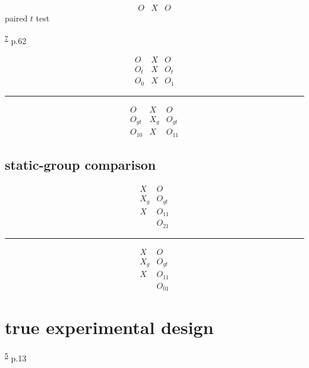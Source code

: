 \documentclass[
]{book}
\theoremstyle{definition}
\theoremstyle{definition}
\theoremstyle{definition}
\theoremstyle{definition}
\theoremstyle{remark}
\begin{document}
\[
\begin{array}{ccc}
O & X & O
\end{array}
\]
paired \(t\) test

\textsuperscript{\protect\hyperlink{ref-hu2022}{7}} p.62

\[
\begin{array}{ccc}
O & X & O \\
O_{t} & X & O_{t} \\
O_{0} & X & O_{1}
\end{array}
\]

\begin{center}\rule{0.5\linewidth}{0.5pt}\end{center}

\[
\begin{array}{ccc}
O & X & O \\
O_{gt} & X_{g} & O_{gt} \\
O_{10} & X & O_{11}
\end{array}
\]

\hypertarget{static-group-comparison}{%
\subsection{static-group comparison}\label{static-group-comparison}}

\[
\begin{array}{ccc}
X & O \\
X_{g} & O_{gt} \\
X & O_{11} \\
  & O_{21}
\end{array}
\]

\begin{center}\rule{0.5\linewidth}{0.5pt}\end{center}

\[
\begin{array}{ccc}
X & O \\
X_{g} & O_{gt} \\
X & O_{11} \\
  & O_{01}
\end{array}
\]

\hypertarget{true-experimental-design}{%
\section{true experimental design}\label{true-experimental-design}}

\textsuperscript{\protect\hyperlink{ref-campbell1963}{5}} p.13
\end{document}
